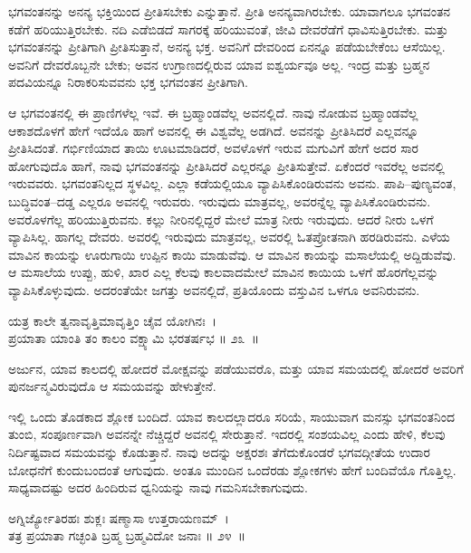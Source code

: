 \newpage

ಭಗವಂತನನ್ನು ಅನನ್ಯ ಭಕ್ತಿಯಿಂದ ಪ್ರೀತಿಸಬೇಕು ಎನ್ನುತ್ತಾನೆ. ಪ್ರೀತಿ ಅನನ್ಯವಾಗಿರಬೇಕು. ಯಾವಾಗಲೂ ಭಗವಂತನ ಕಡೆಗೆ ಹರಿಯುತ್ತಿರಬೇಕು. ನದಿ ಎಡೆಬಿಡದೆ ಸಾಗರಕ್ಕೆ ಹರಿಯುವಂತೆ, ಜೀವಿ ದೇವರೆಡೆಗೆ ಧಾವಿಸುತ್ತಿರಬೇಕು. ಮತ್ತು ಭಗವಂತನನ್ನು ಪ್ರೀತಿಗಾಗಿ ಪ್ರೀತಿಸುತ್ತಾನೆ, ಅನನ್ಯ ಭಕ್ತ. ಅವನಿಗೆ ದೇವರಿಂದ ಏನನ್ನೂ ಪಡೆಯಬೇಕೆಂಬ ಆಸೆಯಿಲ್ಲ. ಅವನಿಗೆ ದೇವರೊಬ್ಬನೇ ಬೇಕು; ಅವನ ಉಗ್ರಾಣದಲ್ಲಿರುವ ಯಾವ ಐಶ್ವರ್ಯವೂ ಅಲ್ಲ. ಇಂದ್ರ ಮತ್ತು ಬ್ರಹ್ಮನ ಪದವಿಯನ್ನೂ ನಿರಾಕರಿಸುವವನು ಭಕ್ತ ಭಗವಂತನ ಪ್ರೀತಿಗಾಗಿ.

ಆ ಭಗವಂತನಲ್ಲಿ ಈ ಪ್ರಾಣಿಗಳೆಲ್ಲ ಇವೆ. ಈ ಬ್ರಹ್ಮಾಂಡವೆಲ್ಲ ಅವನಲ್ಲಿದೆ. ನಾವು ನೋಡುವ ಬ್ರಹ್ಮಾಂಡವೆಲ್ಲ ಆಕಾಶದೊಳಗೆ ಹೇಗೆ ಇದೆಯೊ ಹಾಗೆ ಅವನಲ್ಲಿ ಈ ವಿಶ್ವವೆಲ್ಲ ಅಡಗಿದೆ. ಅವನನ್ನು ಪ್ರೀತಿಸಿದರೆ ಎಲ್ಲವನ್ನೂ ಪ್ರೀತಿಸಿದಂತೆ. ಗರ್ಭಿಣಿಯಾದ ತಾಯಿ ಊಟಮಾಡಿದರೆ, ಅವಳೊಳಗೆ ಇರುವ ಮಗುವಿಗೆ ಹೇಗೆ ಅದರ ಸಾರ ಹೋಗುವುದೊ ಹಾಗೆ, ನಾವು ಭಗವಂತನನ್ನು ಪ್ರೀತಿಸಿದರೆ ಎಲ್ಲರನ್ನೂ ಪ್ರೀತಿಸುತ್ತೇವೆ. ಏಕೆಂದರೆ ಇವರೆಲ್ಲ ಅವನಲ್ಲಿ ಇರುವವರು. ಭಗವಂತನಿಲ್ಲದ ಸ್ಥಳವಿಲ್ಲ. ಎಲ್ಲಾ ಕಡೆಯಲ್ಲಿಯೂ ವ್ಯಾಪಿಸಿಕೊಂಡಿರುವನು ಅವನು. ಪಾಪಿ–ಪುಣ್ಯವಂತ, ಬುದ್ಧಿವಂತ–ದಡ್ಡ ಎಲ್ಲರೂ ಅವನಲ್ಲಿ ಇರುವರು. ಇರುವುದು ಮಾತ್ರವಲ್ಲ, ಅವರನ್ನೆಲ್ಲ ವ್ಯಾಪಿಸಿಕೊಂಡಿರುವನು. ಅವರೊಳಗೆಲ್ಲ ಹರಿಯುತ್ತಿರುವನು. ಕಲ್ಲು ನೀರಿನಲ್ಲಿದ್ದರೆ ಮೇಲೆ ಮಾತ್ರ ನೀರು ಇರುವುದು. ಆದರೆ ನೀರು ಒಳಗೆ ವ್ಯಾಪಿಸಿಲ್ಲ. ಹಾಗಲ್ಲ ದೇವರು. ಅವರಲ್ಲಿ ಇರುವುದು ಮಾತ್ರವಲ್ಲ, ಅವರಲ್ಲಿ ಓತಪ್ರೋತನಾಗಿ ಹರಡಿರುವನು. ಎಳೆಯ ಮಾವಿನ ಕಾಯನ್ನು ಊರುಗಾಯಿ ಉಪ್ಪಿನ ಕಾಯಿ ಮಾಡುವೆವು. ಆ ಮಾವಿನ ಕಾಯನ್ನು ಮಸಾಲೆಯಲ್ಲಿ ಅದ್ದಿಡುವೆವು. ಆ ಮಸಾಲೆಯ ಉಪ್ಪು, ಹುಳಿ, ಖಾರ ಎಲ್ಲ ಕೆಲವು ಕಾಲವಾದಮೇಲೆ ಮಾವಿನ ಕಾಯಿಯ ಒಳಗೆ ಹೊರಗೆಲ್ಲವನ್ನು ವ್ಯಾಪಿಸಿಕೊಳ್ಳುವುದು. ಅದರಂತೆಯೇ ಜಗತ್ತು ಅವನಲ್ಲಿದೆ, ಪ್ರತಿಯೊಂದು ವಸ್ತುವಿನ ಒಳಗೂ ಅವನಿರುವನು.

\begin{shloka}
ಯತ್ರ ಕಾಲೇ ತ್ವನಾವೃತ್ತಿಮಾವೃತ್ತಿಂ ಚೈವ ಯೋಗಿನಃ~।\\ಪ್ರಯಾತಾ ಯಾಂತಿ ತಂ ಕಾಲಂ ವಕ್ಷ್ಯಾಮಿ ಭರತರ್ಷಭ \hfill॥ ೨೩~॥
\end{shloka}

\begin{artha}
ಅರ್ಜುನ, ಯಾವ ಕಾಲದಲ್ಲಿ ಹೋದರೆ ಮೋಕ್ಷವನ್ನು ಪಡೆಯುವರೊ, ಮತ್ತು ಯಾವ ಸಮಯದಲ್ಲಿ ಹೋದರೆ ಅವರಿಗೆ ಪುನರ್ಜನ್ಮವಿರುವುದೊ ಆ ಸಮಯವನ್ನು ಹೇಳುತ್ತೇನೆ.
\end{artha}

ಇಲ್ಲಿ ಒಂದು ತೊಡಕಾದ ಶ್ಲೋಕ ಬಂದಿದೆ. ಯಾವ ಕಾಲದಲ್ಲಾದರೂ ಸರಿಯೆ, ಸಾಯುವಾಗ ಮನಸ್ಸು ಭಗವಂತನಿಂದ ತುಂಬಿ, ಸಂಪೂರ್ಣವಾಗಿ ಅವನನ್ನೇ ನೆಚ್ಚಿದ್ದರೆ ಅವನಲ್ಲಿ ಸೇರುತ್ತಾನೆ. ಇದರಲ್ಲಿ ಸಂಶಯವಿಲ್ಲ ಎಂದು ಹೇಳಿ, ಕೆಲವು ನಿರ್ದಿಷ್ಟವಾದ ಸಮಯವನ್ನು ಕೊಡುತ್ತಾನೆ. ನಾವು ಅದನ್ನು ಅಕ್ಷರಶಃ ತೆಗೆದುಕೊಂಡರೆ ಭಗವದ್ಗೀತೆಯ ಉದಾರ ಬೋಧನೆಗೆ ಕುಂದು\break ಬಂದಂತೆ ಆಗುವುದು. ಅಂತೂ ಮುಂದಿನ ಒಂದೆರಡು ಶ್ಲೋಕಗಳು ಹೇಗೆ ಬಂದಿವೆಯೊ ಗೊತ್ತಿಲ್ಲ. ಸಾಧ್ಯವಾದಷ್ಟು ಅದರ ಹಿಂದಿರುವ ಧ್ವನಿಯನ್ನು ನಾವು ಗಮನಿಸಬೇಕಾಗುವುದು.

\begin{shloka}
ಅಗ್ನಿರ್ಜ್ಯೋತಿರಹಃ ಶುಕ್ಲಃ ಷಣ್ಮಾಸಾ ಉತ್ತರಾಯಣಮ್~।\\ತತ್ರ ಪ್ರಯಾತಾ ಗಚ್ಛಂತಿ ಬ್ರಹ್ಮ ಬ್ರಹ್ಮವಿದೋ ಜನಾಃ \hfill॥ ೨೪~॥
\end{shloka}

